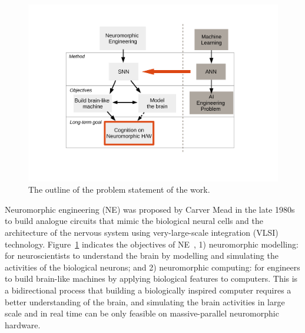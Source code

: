 \begin{figure}[tbh!]
	\centering
	\includegraphics[width=1.0\textwidth]{pics_intro/intro2.pdf}
	\caption{
		The outline of the problem statement of the work.
		}
	\label{fig:intro}
\end{figure}
Neuromorphic engineering (NE) was proposed by Carver Mead in the late 1980s~\cite{Mead:1989:AVN:64998} to build analogue circuits that mimic the biological neural cells and the architecture of the nervous system using very-large-scale integration (VLSI) technology.
Figure~\ref{fig:intro} indicates the objectives of NE~\cite{furber2007neural}, 1) neuromorphic modelling: for neuroscientists to understand the brain by modelling and simulating the activities of the biological neurons; and 2) neuromorphic computing: for engineers to build brain-like machines by applying biological features to computers.
This is a bidirectional process that building a biologically inspired computer requires a better understanding of the brain, and simulating the brain activities in large scale and in real time can be only feasible on massive-parallel neuromorphic hardware.

